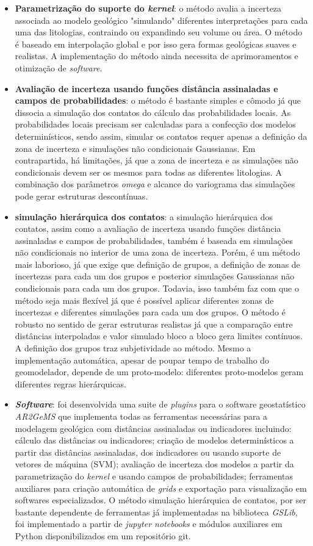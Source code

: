 \begin{itemize}
    \item \textbf{Parametrização do suporte do \textit{kernel}}: o método avalia a incerteza associada ao modelo geológico "simulando" diferentes interpretações para cada uma das litologias, contraindo ou expandindo seu volume ou área. O método é baseado em interpolação global e por isso gera formas geológicas suaves e realistas. A implementação do método ainda necessita de aprimoramentos e otimização de \textit{software}.
    \item \textbf{Avaliação de incerteza usando funções distância assinaladas e campos de probabilidades}: o método é bastante simples e cômodo já que dissocia a simulação dos contatos do cálculo das probabilidades locais. As probabilidades locais precisam ser calculadas para a confecção dos modelos determinísticos, sendo assim, simular os contatos requer apenas a definição da zona de incerteza e simulações não condicionais Gaussianas. Em contrapartida, há limitações, já que a zona de incerteza e as simulações não condicionais devem ser os mesmos para todas as diferentes litologias. A combinação dos parâmetros \textit{omega} e alcance do variograma das simulações pode gerar estruturas descontínuas. 
    \item \textbf{simulação hierárquica dos contatos}: a simulação hierárquica dos contatos, assim como a avaliação de incerteza usando funções distância assinaladas e campos de probabilidades, também é baseada em simulações não condicionais no interior de uma zona de incerteza. Porém, é um método mais laborioso, já que exige que definição de grupos, a definição de zonas de incertezas para cada um dos grupos e posterior simulações Gaussianas não condicionais para cada um dos grupos. Todavia, isso também faz com que o método seja mais flexível já que é possível aplicar diferentes zonas de incertezas e diferentes simulações para cada um dos grupos. O método é robusto no sentido de gerar estruturas realistas já que a comparação entre distâncias interpoladas e valor simulado bloco a bloco gera limites contínuos. A definição dos grupos traz subjetividade ao método. Mesmo a implementação automática, apesar de poupar tempo de trabalho do geomodelador, depende de um proto-modelo: diferentes proto-modelos geram diferentes regras hierárquicas.
    \item \textbf{\textit{Software}}: foi desenvolvida uma suite de \textit{plugins} para o software geostatístico \textit{AR2GeMS} que implementa todas as ferramentas necessárias para a modelagem geológica com distâncias assinaladas ou indicadores incluindo: cálculo das distâncias ou indicadores; criação de modelos determinísticos a partir das distâncias assinaladas, dos indicadores ou usando suporte de vetores de máquina (SVM); avaliação de incerteza dos modelos a partir da parametrização do \textit{kernel} e usando campos de probabilidades; ferramentas auxiliares para criação automática de \textit{grids} e exportação para visualização em softwares especializados. O método simulação hierárquica de contatos, por ser bastante dependente de ferramentas já implementadas na biblioteca \textit{GSLib}, foi implementado a partir de \textit{jupyter notebooks} e módulos auxiliares em Python disponibilizados em um repositório git.

\end{itemize}
